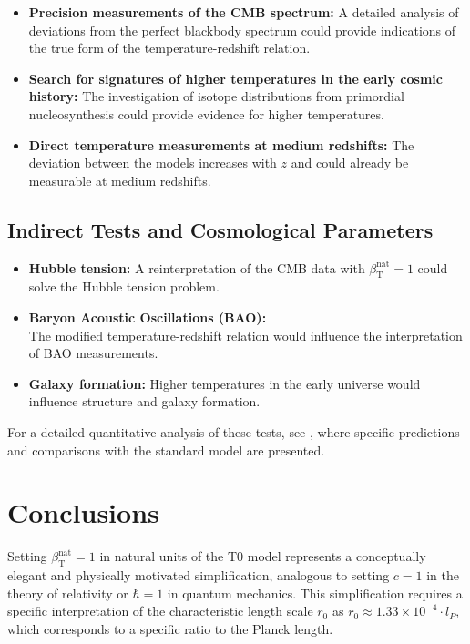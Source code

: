\documentclass[12pt,a4paper]{article}
\newcommand{\betaT}{\beta_{\text{T}}}
\begin{document}
	\begin{itemize}
		\item \textbf{Precision measurements of the CMB spectrum:} A detailed analysis of deviations from the perfect blackbody spectrum could provide indications of the true form of the temperature-redshift relation.
		\item \textbf{Search for signatures of higher temperatures in the early cosmic history:} The investigation of isotope distributions from primordial nucleosynthesis could provide evidence for higher temperatures.
		\item \textbf{Direct temperature measurements at medium redshifts:} The deviation between the models increases with \(z\) and could already be measurable at medium redshifts.
	\end{itemize}
	
	\subsection{Indirect Tests and Cosmological Parameters}
	
	\begin{itemize}
		\item \textbf{Hubble tension:} A reinterpretation of the CMB data with \(\betaT^{\text{nat}} = 1\) could solve the Hubble tension problem.
		\item \textbf{Baryon Acoustic Oscillations (BAO):} \\The modified temperature-redshift relation would influence the interpretation of BAO measurements.
		\item \textbf{Galaxy formation:} Higher temperatures in the early universe would influence structure and galaxy formation.
	\end{itemize}
	
	For a detailed quantitative analysis of these tests, see \cite{pascher_alphabeta_2025}, where specific predictions and comparisons with the standard model are presented.
	
	\section{Conclusions}
	
	Setting \(\betaT^{\text{nat}} = 1\) in natural units of the T0 model represents a conceptually elegant and physically motivated simplification, analogous to setting \(c = 1\) in the theory of relativity or \(\hbar = 1\) in quantum mechanics. This simplification requires a specific interpretation of the characteristic length scale \(r_0\) as \(r_0 \approx 1.33 \times 10^{-4} \cdot l_P\), which corresponds to a specific ratio to the Planck length.
	
\end{document}
